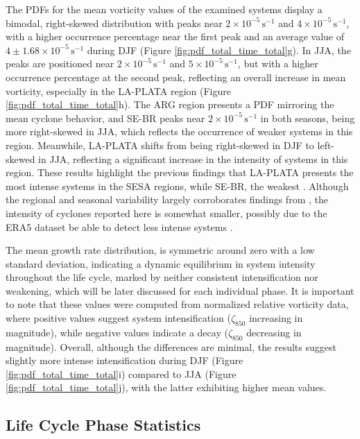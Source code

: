 The PDFs for the mean vorticity values of the examined systems display a bimodal, right-skewed distribution with peaks near \(2 \times 10^{-5} \, \text{s}^{-1}\) and \(4 \times 10^{-5} \, \text{s}^{-1}\), with a higher occurrence percentage near the first peak and an average value of \(4 \pm 1.68 \times 10^{-5} \, \text{s}^{-1}\) during DJF (Figure \ref{fig:pdf_total_time_total}g). In JJA, the peaks are positioned near \(2 \times 10^{-5} \, \text{s}^{-1}\) and \(5 \times 10^{-5} \, \text{s}^{-1}\), but with a higher occurrence percentage at the second peak, reflecting an overall increase in mean vorticity, especially in the LA-PLATA region (Figure \ref{fig:pdf_total_time_total}h). The ARG region presents a PDF mirroring the mean cyclone behavior, and SE-BR peaks near \(2 \times 10^{-5} \, \text{s}^{-1}\) in both seasons, being more right-skewed in JJA, which reflects the occurrence of weaker systems in this region. Meanwhile, LA-PLATA shifts from being right-skewed in DJF to left-skewed in JJA, reflecting a significant increase in the intensity of systems in this region. These results highlight the previous findings that LA-PLATA presents the most intense systems in the SESA regions, while SE-BR, the weakest \citep{simmonds2000mean, reboita2010south, gramcianinov2019properties}. Although the regional and seasonal variability largely corroborates findings from \citet{gramcianinov2019properties}, the intensity of cyclones reported here is somewhat smaller, possibly due to the ERA5 dataset be able to detect less intense systems \citep{gramcianinov2020analysis}.

The mean growth rate distribution, is symmetric around zero with a low standard deviation, indicating a dynamic equilibrium in system intensity throughout the life cycle, marked by neither consistent intensification nor weakening, which will be later discussed for each individual phase. It is important to note that these values were computed from normalized relative vorticity data, where positive values suggest system intensification (\(\zeta_{850}\) increasing in magnitude), while negative values indicate a decay (\(\zeta_{850}\) decreasing in magnitude). Overall, although the differences are minimal, the results suggest slightly more intense intensification during DJF (Figure \ref{fig:pdf_total_time_total}i) compared to JJA (Figure \ref{fig:pdf_total_time_total}j), with the latter exhibiting higher mean values.

\subsection{Life Cycle Phase Statistics}
\label{sec:life_cycle_phase_statistics}


